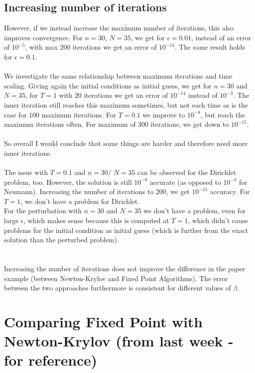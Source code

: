 \documentclass[11pt, a4paper]{article}
\theoremstyle{definition}
\begin{document}
\subsection{Increasing number of iterations}
However, if we instead increase the maximum number of iterations, this also improves convergence. For $n = 30$, $N = 35$, we get for $\epsilon = 0.01$, instead of an error of $10^{-5}$, with max $200$ iterations we get an error of $10^{-14}$. The same result holds for $\epsilon = 0.1$.
\\
\\
We investigate the same relationship between maximum iterations and time scaling. Giving again the initial conditions as initial guess, we get for $n = 30$ and $N = 35$, for $T = 1$ with $20$ iterations we get an error of $10^{-14}$ instead of $10^{-3}$. The inner iteration still reaches this maximum sometimes, but not each time as is the case for $100$ maximum iterations.
For $T = 0.1$ we improve to $10^{-8}$, but reach the maximum iterations often. For maximum of $300$ iterations, we get down to $10^{-15}$.
\\
\\
So overall I would conclude that some things are harder and therefore need more inner iterations.
\\
\\
The issue with $T = 0.1$ and $n = 30$/ $N = 35$ can be observed for the Dirichlet problem, too. However, the solution is still $10^{-8}$ accurate (as opposed to $10^{-3}$ for Neumann). Increasing the number of iterations to $200$, we get $10^{-15}$ accuracy. For $T = 1$, we don't have a problem for Dirichlet.\\
For the perturbation with $n = 30$ and $N = 35$ we don't have a problem, even for large $\epsilon$, which makes sense because this is computed at $T = 1$, which didn't cause problems for the initial condition as initial guess (which is further from the exact solution than the perturbed problem).\\
\\
\\
Increasing the number of iterations does not improve the difference in the paper example (between Newton-Krylov and Fixed Point Algorithms). The error between the two approaches furthermore is consistent for different values of $\beta$.
\section{Comparing Fixed Point with Newton-Krylov (from last week - for reference)}
\end{document}

